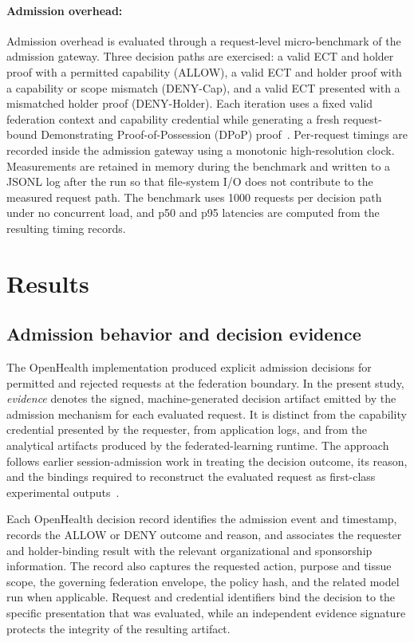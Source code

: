 \documentclass[twoside,11pt]{article}
\begin{document}
\paragraph{\textbf{Admission overhead}:} Admission overhead is evaluated through a request-level micro-benchmark of the admission gateway. Three decision paths are exercised: a valid ECT and holder proof with a permitted capability (ALLOW), a valid ECT and holder proof with a capability or scope mismatch (DENY-Cap), and a valid ECT presented with a mismatched holder proof (DENY-Holder). Each iteration uses a fixed valid federation context and capability credential while generating a fresh request-bound Demonstrating Proof-of-Possession (DPoP) proof~\cite{rfc9449}. Per-request timings are recorded inside the admission gateway using a monotonic high-resolution clock. Measurements are retained in memory during the benchmark and written to a JSONL log after the run so that file-system I/O does not contribute to the measured request path. The benchmark uses 1000 requests per decision path under no concurrent load, and p50 and p95 latencies are computed from the resulting timing records.

\section{Results}

\subsection{Admission behavior and decision evidence}
The OpenHealth implementation produced explicit admission decisions for permitted and rejected requests at the federation boundary. In the present study, \emph{evidence} denotes the signed, machine-generated decision artifact emitted by the admission mechanism for each evaluated request. It is distinct from the capability credential presented by the requester, from application logs, and from the analytical artifacts produced by the federated-learning runtime. The approach follows earlier session-admission work in treating the decision outcome, its reason, and the bindings required to reconstruct the evaluated request as first-class experimental outputs~\cite{Fenoglio_FLICS_2026}.

Each OpenHealth decision record identifies the admission event and timestamp, records the ALLOW or DENY outcome and reason, and associates the requester and holder-binding result with the relevant organizational and sponsorship information. The record also captures the requested action, purpose and tissue scope, the governing federation envelope, the policy hash, and the related model run when applicable. Request and credential identifiers bind the decision to the specific presentation that was evaluated, while an independent evidence signature protects the integrity of the resulting artifact.
\end{document}
